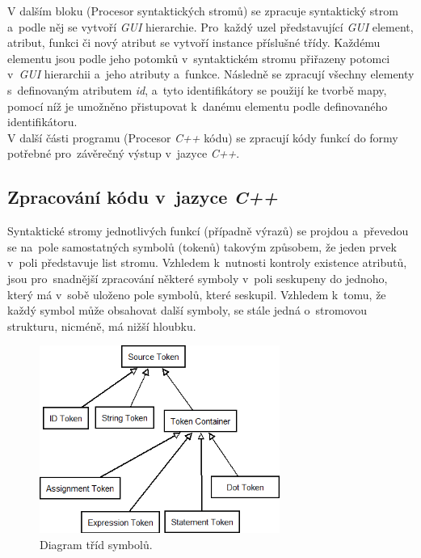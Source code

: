 \documentclass[11pt,twoside,a4paper]{book}
\begin{document}
V dalším bloku (Procesor syntaktických stromů) se zpracuje syntaktický strom a~podle něj se vytvoří \textit{GUI} hierarchie. Pro~každý uzel představující \textit{GUI} element, atribut, funkci či nový atribut se vytvoří instance příslušné třídy. Každému elementu jsou podle jeho potomků v~syntaktickém stromu přiřazeny potomci v~\textit{GUI} hierarchii a~jeho atributy a~funkce.
Následně se zpracují všechny elementy s~definovaným atributem \textit{id}, a~tyto identifikátory se použijí ke tvorbě mapy, pomocí níž je umožněno přistupovat k~danému elementu podle definovaného identifikátoru.\\
V další části programu (Procesor \textit{C++} kódu) se zpracují kódy funkcí do formy potřebné pro~závěrečný výstup v~jazyce \textit{C++}.

\subsection{\label{SEC:tokens}Zpracování kódu v~jazyce \textit{C++}}
Syntaktické stromy jednotlivých funkcí (případně výrazů) se projdou a~převedou se na~pole samostatných symbolů (tokenů) takovým způsobem, že jeden prvek v~poli představuje list stromu. Vzhledem k~nutnosti kontroly existence atributů, jsou pro~snadnější zpracování některé symboly v~poli seskupeny do jednoho, který má v~sobě uloženo pole symbolů, které seskupil. Vzhledem k~tomu, že každý symbol může obsahovat další symboly, se stále jedná o~stromovou strukturu, nicméně, má nižší hloubku.\\
\begin{figure}[!ht]
\begin{center}
  \includegraphics[width=0.7\textwidth]{figures/tokens}
\caption{{\label{fig:fig2}}Diagram tříd symbolů.}
\end{center}
\end{figure}
\end{document}
